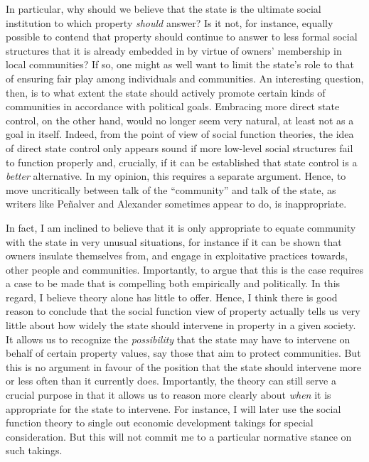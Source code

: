 In particular, why should we believe that the state is the ultimate social institution to which property {\it should} answer? Is it not, for instance, equally possible to contend that property should continue to answer to less formal social structures that it is already embedded in by virtue of owners' membership in local communities? If so, one might as well want to limit the state's role to that of ensuring fair play among individuals and communities. An interesting question, then, is to what extent the state should actively promote certain kinds of communities in accordance with political goals. Embracing more direct state control, on the other hand, would no longer seem very natural, at least not as a goal in itself. Indeed, from the point of view of social function theories, the idea of direct state control only appears sound if more low-level social structures fail to function properly and, crucially, if it can be established that state control is a {\it better} alternative. In my opinion, this requires a separate argument. Hence, to move uncritically between talk of the ``community'' and talk of the state, as writers like Pe\~{n}alver and Alexander sometimes appear to do, is inappropriate.

In fact, I am inclined to believe that it is only appropriate to equate community with the state in very unusual situations, for instance if it can be shown that owners insulate themselves from, and engage in exploitative practices towards, other people and communities. Importantly, to argue that this is the case requires a case to be made that is compelling both empirically and politically. In this regard, I believe theory alone has little to offer. Hence, I think there is good reason to conclude that the social function view of property actually tells us very little about how widely the state should intervene in property in a given society. It allows us to recognize the {\it possibility} that the state may have to intervene on behalf of certain property values, say those that aim to protect communities. But this is no argument in favour of the position that the state should intervene more or less often than it currently does. Importantly, the theory can still serve a crucial purpose in that it allows us to reason more clearly about {\it when} it is appropriate for the state to intervene. For instance, I will later use the social function theory to single out economic development takings for special consideration. But this will not commit me to a particular normative stance on such takings.

